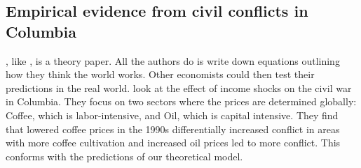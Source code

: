 \subsection*{Empirical evidence from civil conflicts in Columbia}
\citet{dalbodalbo}, like \citet{war}, is a theory paper. All the authors do is write down equations outlining how they think the world works. Other economists could then test their predictions in the real world. \citet{dube2013commodity} look at the effect of income shocks on the civil war in Columbia. They focus on two sectors where the prices are determined globally: Coffee, which is labor-intensive, and Oil, which is capital intensive. They find that lowered coffee prices in the 1990s differentially increased conflict in areas with more coffee cultivation and increased oil prices led to more conflict. This conforms with the predictions of our theoretical model. 
